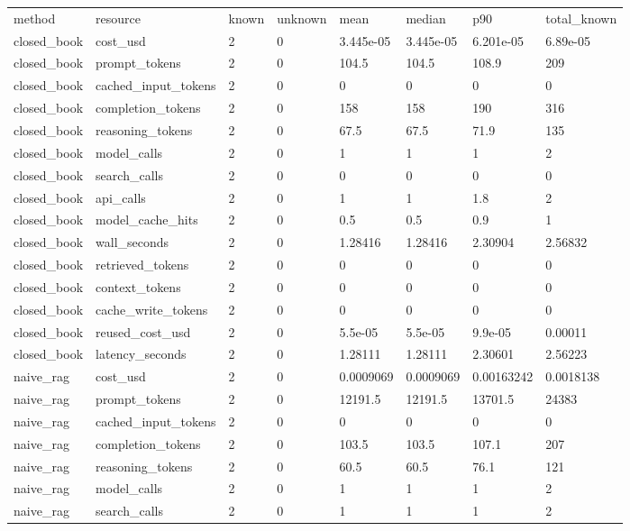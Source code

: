 \begin{tabular}{llllllll}
\hline
method & resource & known & unknown & mean & median & p90 & total\_known \\
closed\_book & cost\_usd & 2 & 0 & 3.445e-05 & 3.445e-05 & 6.201e-05 & 6.89e-05 \\
closed\_book & prompt\_tokens & 2 & 0 & 104.5 & 104.5 & 108.9 & 209 \\
closed\_book & cached\_input\_tokens & 2 & 0 & 0 & 0 & 0 & 0 \\
closed\_book & completion\_tokens & 2 & 0 & 158 & 158 & 190 & 316 \\
closed\_book & reasoning\_tokens & 2 & 0 & 67.5 & 67.5 & 71.9 & 135 \\
closed\_book & model\_calls & 2 & 0 & 1 & 1 & 1 & 2 \\
closed\_book & search\_calls & 2 & 0 & 0 & 0 & 0 & 0 \\
closed\_book & api\_calls & 2 & 0 & 1 & 1 & 1.8 & 2 \\
closed\_book & model\_cache\_hits & 2 & 0 & 0.5 & 0.5 & 0.9 & 1 \\
closed\_book & wall\_seconds & 2 & 0 & 1.28416 & 1.28416 & 2.30904 & 2.56832 \\
closed\_book & retrieved\_tokens & 2 & 0 & 0 & 0 & 0 & 0 \\
closed\_book & context\_tokens & 2 & 0 & 0 & 0 & 0 & 0 \\
closed\_book & cache\_write\_tokens & 2 & 0 & 0 & 0 & 0 & 0 \\
closed\_book & reused\_cost\_usd & 2 & 0 & 5.5e-05 & 5.5e-05 & 9.9e-05 & 0.00011 \\
closed\_book & latency\_seconds & 2 & 0 & 1.28111 & 1.28111 & 2.30601 & 2.56223 \\
naive\_rag & cost\_usd & 2 & 0 & 0.0009069 & 0.0009069 & 0.00163242 & 0.0018138 \\
naive\_rag & prompt\_tokens & 2 & 0 & 12191.5 & 12191.5 & 13701.5 & 24383 \\
naive\_rag & cached\_input\_tokens & 2 & 0 & 0 & 0 & 0 & 0 \\
naive\_rag & completion\_tokens & 2 & 0 & 103.5 & 103.5 & 107.1 & 207 \\
naive\_rag & reasoning\_tokens & 2 & 0 & 60.5 & 60.5 & 76.1 & 121 \\
naive\_rag & model\_calls & 2 & 0 & 1 & 1 & 1 & 2 \\
naive\_rag & search\_calls & 2 & 0 & 1 & 1 & 1 & 2 \\

\end{tabular}
